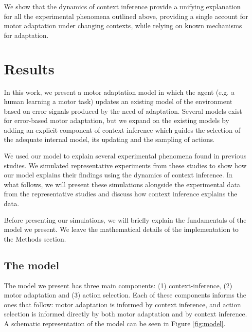 \documentclass[a4paper,doc,floatsintext,natbib]{apa6}
\def \fref #1{Figure \ref{#1}}     %
\begin{document}
We show that the dynamics of context inference provide a unifying explanation for all the experimental phenomena outlined above, providing a single account for motor adaptation under changing contexts, while relying on known mechanisms for adaptation.

\section{Results}
In this work, we present a motor adaptation model in which the agent (e.g. a human learning a motor task) updates an existing model of the environment based on error signals produced by the need of adaptation. Several models exist for error-based motor adaptation, but we expand on the existing models by adding an explicit component of context inference which guides the selection of the adequate internal model, its updating and the sampling of actions.

We used our model to explain several experimental phenomena found in previous studies. We simulated representative experiments from these studies to show how our model explains their findings using the dynamics of context inference. In what follows, we will present these simulations alongside the experimental data from the representative studies and discuss how context inference explains the data.

Before presenting our simulations, we will briefly explain the fundamentals of the model we present. We leave the mathematical details of the implementation to the Methods section.

\subsection{The model}
The model we present has three main components: (1) context-inference, (2) motor adaptation and (3) action selection. Each of these components informs the ones that follow: motor adaptation is informed by context inference, and action selection is informed directly by both motor adaptation and by context inference. A schematic representation of the model can be seen in \fref{fig:model}.
\end{document}
